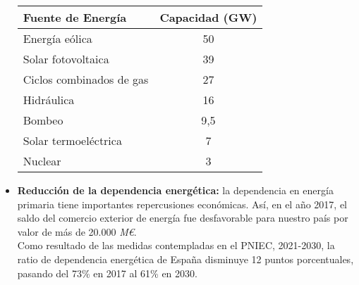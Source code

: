 \begin{itemize}
						\begin{center}
							\begin{table}[h]
								\centering
								\begin{tabular}{lc}
									\textbf{Fuente de Energía} & \textbf{Capacidad (GW)} \\
									\hline
									Energía eólica & 50 \\
									Solar fotovoltaica & 39 \\
									Ciclos combinados de gas & 27 \\
									Hidráulica & 16 \\
									Bombeo & 9,5 \\
									Solar termoeléctrica & 7 \\
									Nuclear & 3 \\
								\end{tabular}
							\end{table}
						\end{center}
						
					\item 
						\textbf{Reducción de la dependencia energética:} la dependencia en energía primaria tiene importantes repercusiones económicas. Así, en el año 2017, el saldo del comercio exterior de energía fue desfavorable para nuestro país por valor de más de 20.000 \textit{M€}.\\
						Como resultado de las medidas contempladas en el PNIEC, 2021-2030, la ratio de dependencia energética de España disminuye 12 puntos porcentuales, pasando del 73\% en 2017 al 61\% en 2030.
						

\end{itemize}
